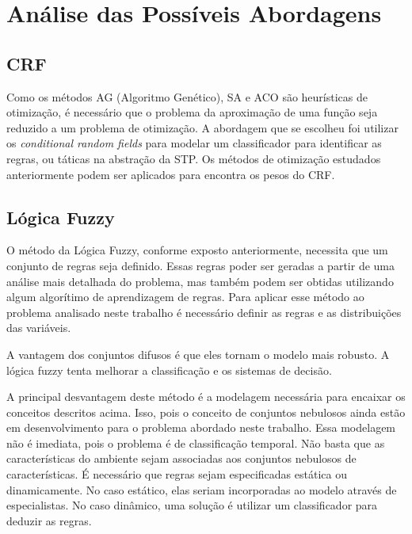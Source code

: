 \chapter{Análise das Possíveis Abordagens}\label{cap:anal_abordagens}


\section{CRF}

Como os métodos AG (Algoritmo Genético), SA e ACO são heurísticas de otimização,
é necessário que o problema da aproximação de uma função seja reduzido a um problema
de otimização. A abordagem que se escolheu foi utilizar os \textit{conditional random
fields} para modelar um classificador para identificar as regras, ou táticas na
abstração da STP\@. Os métodos de otimização estudados anteriormente podem ser
aplicados para encontra os pesos do CRF.

\section{Lógica Fuzzy}

O método da Lógica Fuzzy, conforme exposto anteriormente, necessita que um conjunto
de regras seja definido. Essas regras poder ser geradas a partir de uma análise mais
detalhada do problema, mas também podem ser obtidas utilizando algum algorítimo de
aprendizagem de regras. Para aplicar esse método ao problema analisado neste trabalho
é necessário definir as regras e as distribuições das variáveis.

A vantagem dos conjuntos difusos é que eles tornam o modelo mais robusto. A lógica fuzzy
tenta melhorar a classificação e os sistemas de decisão.

A principal desvantagem deste método é a modelagem necessária para encaixar os conceitos
descritos acima. Isso, pois o conceito de conjuntos nebulosos ainda estão em desenvolvimento
para o problema abordado neste trabalho. Essa modelagem não é imediata, pois o problema é de
classificação temporal. Não basta que as características do ambiente sejam associadas aos
conjuntos nebulosos de características. É necessário que regras sejam especificadas estática
ou dinamicamente. No caso estático, elas seriam incorporadas ao modelo através de especialistas.
No caso dinâmico, uma solução é utilizar um classificador para deduzir as regras.

